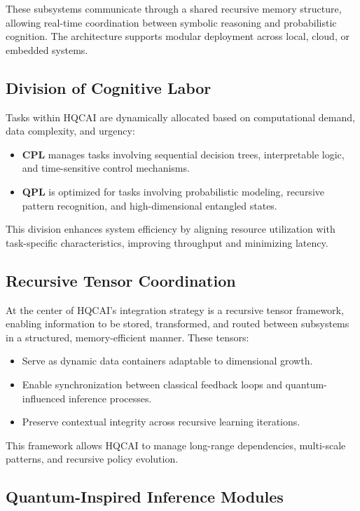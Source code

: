 \documentclass{article}
\theoremstyle{plain}
\theoremstyle{claimstyle}
\begin{document}
These subsystems communicate through a shared recursive memory structure, allowing real-time coordination between symbolic reasoning and probabilistic cognition. The architecture supports modular deployment across local, cloud, or embedded systems.

\subsection{Division of Cognitive Labor}

Tasks within HQCAI are dynamically allocated based on computational demand, data complexity, and urgency:
\begin{itemize}
    \item \textbf{CPL} manages tasks involving sequential decision trees, interpretable logic, and time-sensitive control mechanisms.
    \item \textbf{QPL} is optimized for tasks involving probabilistic modeling, recursive pattern recognition, and high-dimensional entangled states.
\end{itemize}

This division enhances system efficiency by aligning resource utilization with task-specific characteristics, improving throughput and minimizing latency.

\subsection{Recursive Tensor Coordination}

At the center of HQCAI's integration strategy is a recursive tensor framework, enabling information to be stored, transformed, and routed between subsystems in a structured, memory-efficient manner. These tensors:
\begin{itemize}
    \item Serve as dynamic data containers adaptable to dimensional growth.
    \item Enable synchronization between classical feedback loops and quantum-influenced inference processes.
    \item Preserve contextual integrity across recursive learning iterations.
\end{itemize}

This framework allows HQCAI to manage long-range dependencies, multi-scale patterns, and recursive policy evolution.

\subsection{Quantum-Inspired Inference Modules}
\end{document}
